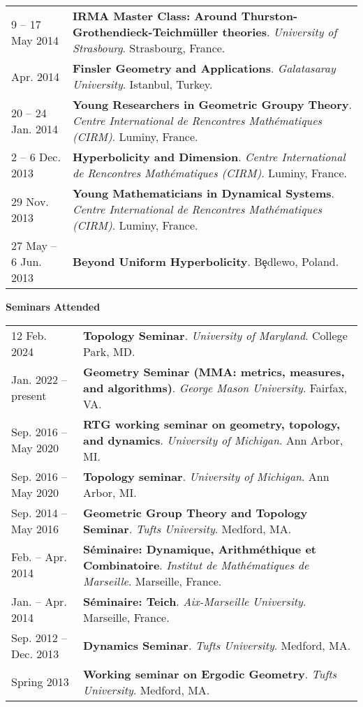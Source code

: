 \begin{center}
{\begin{longtable}{p{}  p{}}
9  -- 17 May  2014 & \textbf{IRMA Master Class: Around Thurston-Grothendieck-Teichm\"uller theories}. \textit{University of Strasbourg}.  Strasbourg, France.  \\ 
 Apr.  2014 & \textbf{Finsler Geometry and Applications}. \textit{Galatasaray University}.  Istanbul, Turkey.  \\ 
20  -- 24 Jan.  2014 & \textbf{Young Researchers in Geometric Groupy Theory}. \textit{Centre International de Rencontres Math\'ematiques (CIRM)}.  Luminy, France.  \\ 
2  -- 6 Dec.  2013 & \textbf{Hyperbolicity and Dimension}. \textit{Centre International de Rencontres Math\'ematiques (CIRM)}.  Luminy, France.  \\ 
29 Nov.  2013 & \textbf{Young Mathematicians in Dynamical Systems}. \textit{Centre International de Rencontres Math\'ematiques (CIRM)}.  Luminy, France.  \\ 
27 May  -- 6 Jun.  2013 & \textbf{Beyond Uniform Hyperbolicity}.  B\c{e}dlewo, Poland.  
    \end{longtable}
    } 
    \end{center}

    \vspace{-1em}
    

    \textbf{\large Seminars Attended}
    
    \begin{center}
    {
    \renewcommand{\arraystretch}{1.5}
    \begin{longtable}{p{}  p{}}
    12 Feb.  2024 & \textbf{Topology Seminar}. \textit{University of Maryland}.  College Park, MD.  \\ 
 Jan.  2022 -- present & \textbf{Geometry Seminar (MMA: metrics, measures, and algorithms)}. \textit{George Mason University}.  Fairfax, VA.  \\ 
 Sep.  2016 --  May  2020 & \textbf{RTG working seminar on geometry, topology, and dynamics}. \textit{University of Michigan}.  Ann Arbor, MI.  \\ 
 Sep.  2016 --  May  2020 & \textbf{Topology seminar}. \textit{University of Michigan}.  Ann Arbor, MI.  \\ 
 Sep.  2014 --  May  2016 & \textbf{Geometric Group Theory and Topology Seminar}. \textit{Tufts University}.  Medford, MA.  \\ 
 Feb.  --  Apr.  2014 & \textbf{S\'eminaire: Dynamique, Arithm\'ethique et Combinatoire}. \textit{Institut de Math\'ematiques de Marseille}.  Marseille, France.  \\ 
 Jan.  --  Apr.  2014 & \textbf{S\'eminaire: Teich}. \textit{Aix-Marseille University}.  Marseille, France.  \\ 
 Sep.  2012 --  Dec.  2013 & \textbf{Dynamics Seminar}. \textit{Tufts University}.  Medford, MA.  \\ 
  Spring 2013 & \textbf{Working seminar on Ergodic Geometry}. \textit{Tufts University}.  Medford, MA.  
    \end{longtable}
    } 
    \end{center}

